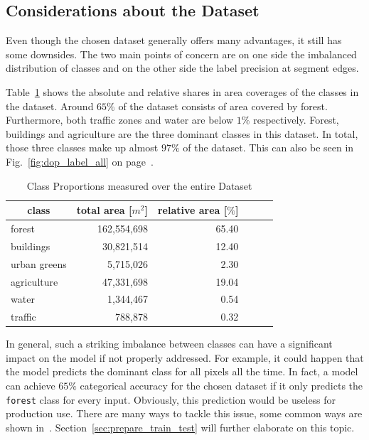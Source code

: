 \subsection{Considerations about the Dataset}
\label{sec:dataset_considerations}

Even though the chosen dataset generally offers many advantages, it still has some downsides. The two main points of concern are on one side the imbalanced distribution of classes and on the other side the label precision at segment edges.

Table~\ref{tab:seg-breakdown} shows the absolute and relative shares in area coverages of the classes in the dataset. Around $65\%$ of the dataset consists of area covered by forest. Furthermore, both traffic zones and water are below $1\%$ respectively. Forest, buildings and agriculture are the three dominant classes in this dataset. In total, those three classes make up almost $97\%$ of the dataset. This can also be seen in Fig.~\ref{fig:dop_label_all} on page~\pageref{fig:dop_label_all}.

\begin{table}[h]
\centering
\caption{Class Proportions measured over the entire Dataset}
\label{tab:seg-breakdown}
\begin{tabular}{|l|r|r|r|r|r|}
\hline
\multicolumn{1}{|c|}{\textbf{class}} &
  \multicolumn{1}{c|}{\textbf{total area [$m^2$]}} &
  \multicolumn{1}{c|}{\textbf{relative area [$\%$]}} \\ \hline
forest       & 162,554,698 & 65.40  \\ \hline
buildings    & 30,821,514  & 12.40  \\ \hline
urban greens & 5,715,026   & 2.30   \\ \hline
agriculture  & 47,331,698  & 19.04  \\ \hline
water        & 1,344,467   & 0.54   \\ \hline
traffic      & 788,878     & 0.32   \\ \hline
\end{tabular}
\end{table}
\clearpage

In general, such a striking imbalance between classes can have a significant impact on the model if not properly addressed. For example, it could happen that the model predicts the dominant class for all pixels all the time. In fact, a model can achieve $65\%$ categorical accuracy for the chosen dataset if it only predicts the \texttt{forest} class for every input. Obviously, this prediction would be useless for production use. There are many ways to tackle this issue, some common ways are shown in~\cite{imbalanced_data09}. Section~\ref{sec:prepare_train_test} will further elaborate on this topic.

